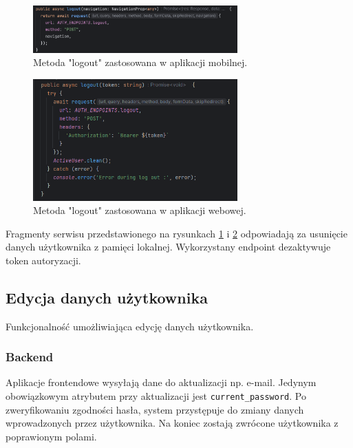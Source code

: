 \begin{figure}[H]
    \centering
    \includegraphics[width=0.7\textwidth]{chapters/chapter_8/screens/wylogowanie_mobile}
    \caption{Metoda "logout" zastosowana w aplikacji mobilnej.}
    \label{img:wylogowanie_mobile}
\end{figure}

\begin{figure}[H]
    \centering
    \includegraphics[width=0.7\textwidth]{chapters/chapter_8/screens/wylogowanie_web}
    \caption{Metoda "logout" zastosowana w aplikacji webowej.}
    \label{img:wylogowanie_web}
\end{figure}

Fragmenty serwisu przedstawionego na rysunkach \ref{img:wylogowanie_mobile} i \ref{img:wylogowanie_web} odpowiadają za usunięcie danych użytkownika z pamięci lokalnej. Wykorzystany endpoint dezaktywuje token autoryzacji.

\subsection{Edycja danych użytkownika}
Funkcjonalność umożliwiająca edycję danych użytkownika.

\subsubsection{Backend}
Aplikacje frontendowe wysyłają dane do aktualizacji np. e-mail. Jedynym obowiązkowym atrybutem przy aktualizacji jest \texttt{current\_password}. Po zweryfikowaniu zgodności hasła, system przystępuje do zmiany danych wprowadzonych przez użytkownika. Na koniec zostają zwrócone użytkownika z poprawionym polami.


